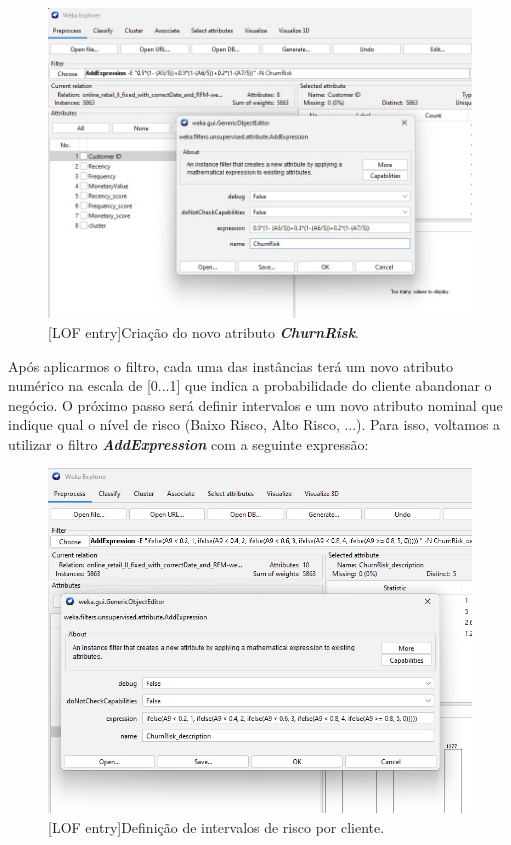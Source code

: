 \documentclass{easychair}
\begin{document}
\begin{figure}[H]
    \begin{centering}
    \includegraphics[width=1\linewidth]{imagens/figure20.jpg}\label{cap-3-fig20}
    [LOF entry]{Criação do novo atributo \textit{\textbf{ChurnRisk}}.}
    \label{fig20}
    \end{centering}
\end{figure}

Após aplicarmos o filtro, cada uma das instâncias terá um novo atributo numérico na escala de [0...1] que indica a probabilidade do cliente abandonar o negócio. O próximo passo será definir intervalos e um novo atributo nominal que indique qual o nível de risco (Baixo Risco, Alto Risco, ...). Para isso, voltamos a utilizar o filtro \textit{\textbf{AddExpression}} com a seguinte expressão:

\begin{figure}[H]
    \begin{centering}
    \includegraphics[width=1\linewidth]{imagens/figure21.jpg}\label{cap-3-fig21}
    [LOF entry]{Definição de intervalos de risco por cliente.}
    \label{fig21}
    \end{centering}
\end{figure}
\end{document}
